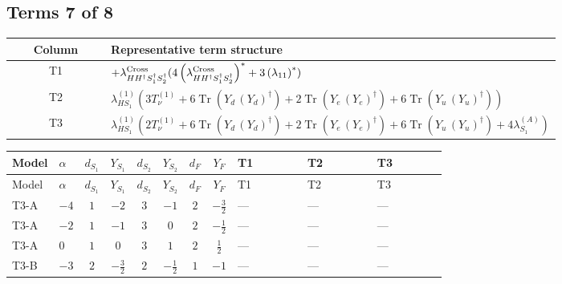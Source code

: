 \documentclass[8pt]{article}
\begin{document}
\begin{landscape}
\subsection*{Terms 7 of 8}
\begin{center}
\begin{tabular}{@{}c >{\raggedright\arraybackslash}p{0.82\linewidth}@{}}
\toprule
Column & Representative term structure \\
\midrule
T1 & \(\displaystyle +{\lambda_{H H^\dagger S_1^\dagger S_2^\dagger}^{\rm Cross}} (4 \left({\lambda_{H H^\dagger S_1^\dagger S_2^\dagger}^{\rm Cross}}\right)^{*}+3 \left({\lambda_{11}}\right)^{*})\) \\
\midrule
T2 & \(\displaystyle {\lambda_{HS_1}^{(1)}} (3 T_{\nu}^{(1)}+6 \operatorname{Tr}\!\left({Y_d}\,\left({Y_d}\right)^{\dagger}\right)+2 \operatorname{Tr}\!\left({Y_e}\,\left({Y_e}\right)^{\dagger}\right)+6 \operatorname{Tr}\!\left({Y_u}\,\left({Y_u}\right)^{\dagger}\right))\) \\
\midrule
T3 & \(\displaystyle {\lambda_{HS_1}^{(1)}} (2 T_{\nu}^{(1)}+6 \operatorname{Tr}\!\left({Y_d}\,\left({Y_d}\right)^{\dagger}\right)+2 \operatorname{Tr}\!\left({Y_e}\,\left({Y_e}\right)^{\dagger}\right)+6 \operatorname{Tr}\!\left({Y_u}\,\left({Y_u}\right)^{\dagger}\right)+4 {\lambda_{S_1}^{(A)}})\) \\
\midrule
\bottomrule
\end{tabular}
\end{center}
\smallskip
\tiny
\begin{longtable}{@{}llcccccc >{\raggedright\arraybackslash}p{0.21\linewidth} >{\raggedright\arraybackslash}p{0.21\linewidth} >{\raggedright\arraybackslash}p{0.21\linewidth}@{}}
\toprule
Model & $\alpha$ & $d_{S_1}$ & $Y_{S_1}$ & $d_{S_2}$ & $Y_{S_2}$ & $d_F$ & $Y_F$ & T1 & T2 & T3 \\
\midrule
\endfirsthead
\toprule
Model & $\alpha$ & $d_{S_1}$ & $Y_{S_1}$ & $d_{S_2}$ & $Y_{S_2}$ & $d_F$ & $Y_F$ & T1 & T2 & T3 \\
\midrule
\endhead
T3-A & $-4$ & $1$ & $-2$ & $3$ & $-1$ & $2$ & $-\frac{3}{2}$ & --- & --- & --- \\
\midrule
T3-A & $-2$ & $1$ & $-1$ & $3$ & $0$ & $2$ & $-\frac{1}{2}$ & --- & --- & --- \\
\midrule
T3-A & $0$ & $1$ & $0$ & $3$ & $1$ & $2$ & $\frac{1}{2}$ & --- & --- & --- \\
\midrule
T3-B & $-3$ & $2$ & $-\frac{3}{2}$ & $2$ & $-\frac{1}{2}$ & $1$ & $-1$ & --- & --- & --- \\
\midrule

\end{longtable}
\end{landscape}
\end{document}
